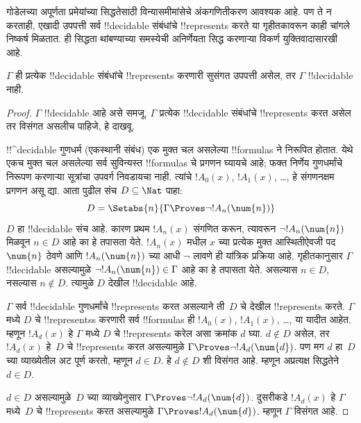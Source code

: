 \documentclass[../../../include/open-logic-section]{subfiles}
\begin{document}


गोडेलच्या अपूर्णता प्रमेयांच्या सिद्धतेसाठी विन्यासमीमांसेचे
अंकगणितीकरण आवश्यक आहे. पण ते न करताही, एखादी उपपत्ती सर्व
!!{decidable} संबंधांचे !!{represents} करते या गृहीतकावरून काही
चांगले निष्कर्ष मिळतात. ही सिद्धता थांबण्याच्या समस्येची अनिर्णेयता
सिद्ध करणाऱ्या विकर्ण युक्तिवादासारखी आहे.

\begin{thm}
$\Gamma$ ही प्रत्येक !!{decidable} संबंधांचे !!{represents}
करणारी सुसंगत उपपत्ती असेल, तर $\Gamma$ !!{decidable} नाही.
\end{thm}

\begin{proof}
$\Gamma$ !!{decidable} आहे असे समजू. $\Gamma$ प्रत्येक
!!{decidable} संबंधांचे !!{represents} करत असेल तर विसंगत असलीच
पाहिजे, हे दाखवू.

!!^{decidable} गुणधर्म (एकस्थानी संबंध) एक मुक्त चल असलेल्या
!!{formula}s ने निरूपित होतात. येथे एकच मुक्त चल असलेल्या सर्व
सुविन्यस्त !!{formula}s चे प्रगणन घ्यायचे आहे; फक्त निर्णेय गुणधर्मांचे
निरूपण करणाऱ्या सूत्रांचा उपवर्ग निवडायचा नाही. त्यांचे
$!A_0(x)$, $!A_1(x)$, \dots, हे संगणनक्षम प्रगणन असू द्या.
आता पुढील संच $D \subseteq \Nat$ पाहा:
\[
D = \Setabs{n}{\Gamma \Proves \lnot !A_n(\num{n})}
\]
$D$ हा !!{decidable} संच आहे. कारण प्रथम $!A_n(x)$ संगणित
करून, त्यावरून $\lnot !A_n(\num{n})$ मिळवून $n \in D$
आहे का हे तपासता येते. $!A_n(x)$ मधील $x$ च्या प्रत्येक मुक्त
आस्थितीऐवजी पद $\num{n}$ ठेवणे आणि $!A_n(\num{n})$ च्या
आधी $\lnot$ लावणे ही यांत्रिक प्रक्रिया आहे. गृहीतकानुसार
$\Gamma$ !!{decidable} असल्यामुळे
$\lnot !A_n(\num{n}) \in \Gamma$ आहे का हे तपासता येते.
असल्यास $n \in D$, नसल्यास $n \notin D$. त्यामुळे $D$
देखील !!{decidable} आहे.

$\Gamma$ सर्व !!{decidable} गुणधर्मांचे !!{represents} करत
असल्याने ती~$D$ चे देखील !!{represents} करते. $\Gamma$ मध्ये
$D$ चे !!{represents}s करणारी सर्व !!{formula}s ही $!A_0(x)$,
$!A_1(x)$, \dots, या यादीत आहेत. म्हणून $!A_d(x)$ हे
$\Gamma$ मध्ये $D$ चे !!{represents} करेल असा क्रमांक $d$
घ्या. $d
\notin D$ असेल, तर $!A_d(x)$ हे~$D$ चे !!{represents}
करत असल्यामुळे $\Gamma \Proves
\lnot !A_d(\num{d})$. पण मग $d$ हा~$D$ च्या व्याख्येतील
अट पूर्ण करतो, म्हणून $d \in D$. हे $d \notin D$ शी
विसंगत आहे. म्हणून अप्रत्यक्ष सिद्धतेने $d \in D$.

$d \in D$ असल्यामुळे~$D$ च्या व्याख्येनुसार $\Gamma \Proves \lnot
!A_d(\num{d})$. दुसरीकडे $!A_d(x)$ हे $\Gamma$ मध्ये~$D$ चे
!!{represents} करत असल्यामुळे $\Gamma \Proves !A_d(\num{d})$.
म्हणून $\Gamma$ विसंगत आहे.
\end{proof}
\end{document}
